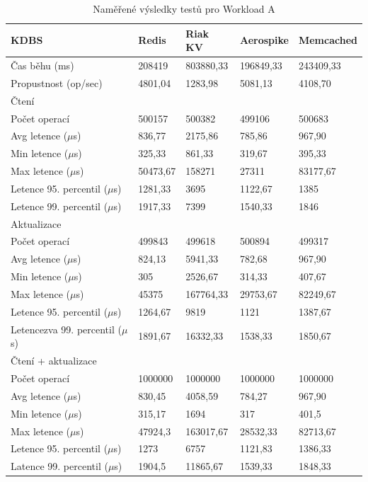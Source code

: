 \documentclass[czech,master,dept460,male,csharp,cpdeclaration]{diploma}
\begin{document}
	\begin{table}
		\centering
		\begin{tabular}{ l | l l l l }
			\toprule
			KDBS & Redis & Riak KV & Aerospike & Memcached \\
			\midrule
			Čas běhu (ms) & 208419 & 803880,33 & 196849,33 & 243409,33 \\
			Propustnost (op/sec) & 4801,04 & 1283,98 & 5081,13 & 4108,70 \\
			\midrule
			\multicolumn{5}{l}{Čtení} \\
			Počet operací & 500157 & 500382 & 499106 & 500683 \\
			Avg letence ($\mu$s) & 836,77 & 2175,86 & 785,86 & 967,90 \\
			Min letence ($\mu$s) & 325,33 & 861,33 & 319,67 & 395,33 \\
			Max letence ($\mu$s) & 50473,67 & 158271 & 27311 & 83177,67 \\
			Letence 95. percentil ($\mu$s) & 1281,33 & 3695 & 1122,67 & 1385 \\
			Letence 99. percentil ($\mu$s) & 1917,33 & 7399 & 1540,33 & 1846 \\
			\midrule
			\multicolumn{5}{l}{Aktualizace} \\
			Počet operací & 499843 & 499618 & 500894 & 499317 \\
			Avg letence ($\mu$s) & 824,13 & 5941,33 & 782,68 & 967,90 \\
			Min letence ($\mu$s) & 305 & 2526,67 & 314,33 & 407,67 \\
			Max letence ($\mu$s) & 45375 & 167764,33 & 29753,67 & 82249,67 \\
			Letence 95. percentil ($\mu$s) & 1264,67 & 9819 & 1121 & 1387,67 \\
			Letencezva 99. percentil ($\mu$s) & 1891,67 & 16332,33 & 1538,33 & 1850,67 \\
			\midrule
			\multicolumn{5}{l}{Čtení + aktualizace} \\
			Počet operací & 1000000 & 1000000 & 1000000 & 1000000 \\
			Avg letence ($\mu$s) & 830,45 & 4058,59 & 784,27 & 967,90 \\
			Min letence ($\mu$s) & 315,17 & 1694 & 317 & 401,5 \\
			Max letence ($\mu$s) & 47924,3 & 163017,67 & 28532,33 & 82713,67 \\
			Letence 95. percentil ($\mu$s) & 1273 & 6757 & 1121,83 & 1386,33 \\
			Latence 99. percentil ($\mu$s) & 1904,5 & 11865,67 & 1539,33 & 1848,33 \\
			\bottomrule
		\end{tabular}
		\caption{Naměřené výsledky testů pro Workload A\label{tab_workload_a}}
	\end{table}
	
\end{document}
